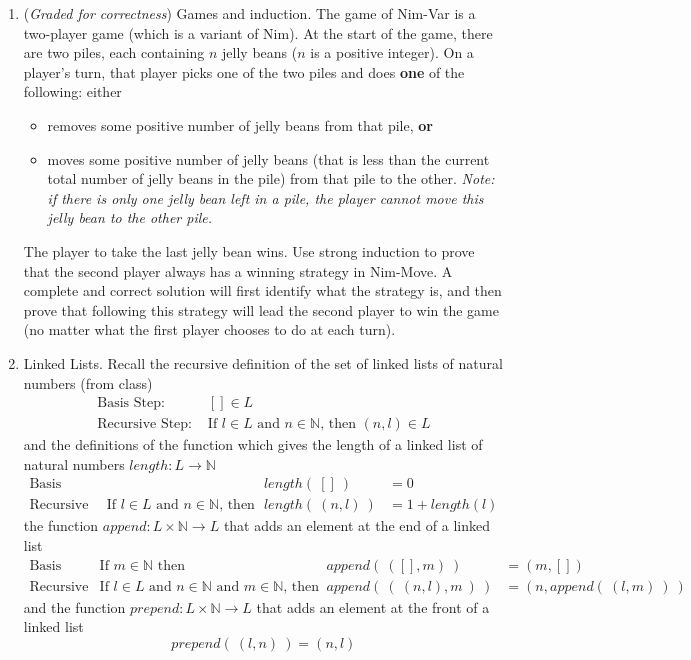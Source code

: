 \documentclass[12pt, oneside]{article}
\newcommand{\gradeCorrect}{({\it Graded for correctness}) }
\begin{document}
\begin{enumerate}[labelindent=0pt, leftmargin=0pt]
    \item \gradeCorrect Games and induction.  The game of Nim-Var is a two-player game (which is a variant of Nim).
    At the start of the game, there are two piles, each containing $n$ 
    jelly beans
    ($n$ is a positive integer).  On a player's turn, that player picks one 
    of the two piles and does {\bf one} of the following: either
    \begin{itemize}
    \item removes some positive number of jelly beans from that pile, {\bf or}
    \item moves some positive number of jelly beans (that is less than the
    current total number of jelly beans in the pile) from that pile to the other.  
    {\it Note: if there is only one jelly bean left in a pile, the player cannot move
    this jelly bean to the other pile.}
    \end{itemize}
    The player to take the last jelly bean wins.  
    Use strong induction to prove that the second player always has a winning strategy in Nim-Move.
    A complete and correct solution will first identify what the strategy is, and then prove that 
    following this strategy will lead the second player to win the game (no matter what the first 
    player chooses to do at each turn).
    
    
    
    \item Linked Lists. Recall the recursive definition of the set of linked lists of 
    natural numbers (from class)
    \[
    \begin{array}{ll}
        \textrm{Basis Step: } & [] \in L \\
        \textrm{Recursive Step: } & \textrm{If } l \in L\textrm{ and }n \in \mathbb{N} \textrm{, then } (n, l) \in L
    \end{array}
    \]
    and the definitions of the function which gives the length of a linked list of natural numbers 
    $length: L \to \mathbb{N}$
        \[
        \begin{array}{llll}
            \textrm{Basis Step:} &  & length(~[]~) &= 0 \\
            \textrm{Recursive Step:} & \textrm{If } l \in L\textrm{ and }n \in \mathbb{N}\textrm{, then  } & length(~(n, l)~)  &= 1+ length(l)
        \end{array}
    \]
    the function $append : L \times \mathbb{N} \to L$ that 
    adds an element at the end of a linked list
    \[
        \begin{array}{llll}
        \textrm{Basis Step:} & \textrm{If } m \in \mathbb{N}\textrm{ then } & append(~([], m)~) & = (m, [])\\
        \textrm{Recursive Step:} & \textrm{If } l \in L\textrm{ and }n \in \mathbb{N}\textrm{ and }m \in \mathbb{N}\textrm{, then  } & append(~(~(n, l), m~)~)  &= (n, append(~(l, m)~)~)
        \end{array}
    \]
    and the function $prepend : L \times \mathbb{N} \to L$ that adds an element at the 
    front of a linked list 
    \[
    prepend(~(l, n)~) = (n, l)
    \]


\end{enumerate}
\end{document}
